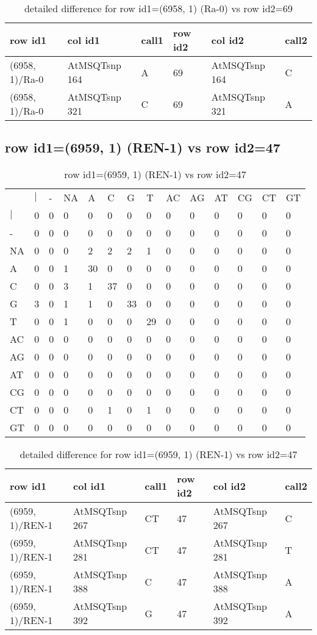 \begin{center}
\begin{longtable}{|l|l|l|l|l|l|}
\caption{detailed difference for row id1=(6958, 1) (Ra-0) vs row id2=69} \label{table_dm167}\\
\hline
row id1&col id1&call1&row id2&col id2&call2\\
\hline
(6958, 1)/Ra-0&AtMSQTsnp 164&A&69&AtMSQTsnp 164&C\\
(6958, 1)/Ra-0&AtMSQTsnp 321&C&69&AtMSQTsnp 321&A\\
\hline
\end{longtable}
\end{center}

\subsection{row id1=(6959, 1) (REN-1) vs row id2=47}
\begin{center}
\begin{longtable}{|l|l|l|l|l|l|l|l|l|l|l|l|l|l|}
\caption{row id1=(6959, 1) (REN-1) vs row id2=47} \label{table_dm168}\\
\hline
\\
\hline
&$|$&-&NA&A&C&G&T&AC&AG&AT&CG&CT&GT\\
$|$&0&0&0&0&0&0&0&0&0&0&0&0&0\\
-&0&0&0&0&0&0&0&0&0&0&0&0&0\\
NA&0&0&0&2&2&2&1&0&0&0&0&0&0\\
A&0&0&1&30&0&0&0&0&0&0&0&0&0\\
C&0&0&3&1&37&0&0&0&0&0&0&0&0\\
G&3&0&1&1&0&33&0&0&0&0&0&0&0\\
T&0&0&1&0&0&0&29&0&0&0&0&0&0\\
AC&0&0&0&0&0&0&0&0&0&0&0&0&0\\
AG&0&0&0&0&0&0&0&0&0&0&0&0&0\\
AT&0&0&0&0&0&0&0&0&0&0&0&0&0\\
CG&0&0&0&0&0&0&0&0&0&0&0&0&0\\
CT&0&0&0&0&1&0&1&0&0&0&0&0&0\\
GT&0&0&0&0&0&0&0&0&0&0&0&0&0\\
\hline
\end{longtable}
\end{center}

\begin{center}
\begin{longtable}{|l|l|l|l|l|l|}
\caption{detailed difference for row id1=(6959, 1) (REN-1) vs row id2=47} \label{table_dm169}\\
\hline
row id1&col id1&call1&row id2&col id2&call2\\
\hline
(6959, 1)/REN-1&AtMSQTsnp 267&CT&47&AtMSQTsnp 267&C\\
(6959, 1)/REN-1&AtMSQTsnp 281&CT&47&AtMSQTsnp 281&T\\
(6959, 1)/REN-1&AtMSQTsnp 388&C&47&AtMSQTsnp 388&A\\
(6959, 1)/REN-1&AtMSQTsnp 392&G&47&AtMSQTsnp 392&A\\
\hline
\end{longtable}
\end{center}

